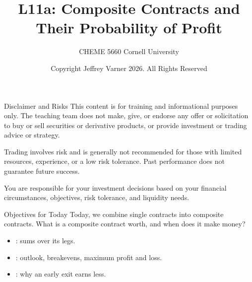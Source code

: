 \documentclass[aspectratio=169,11pt]{beamer}
\title{\texorpdfstring{{\vnheavy L11a}}{L11a}: Composite Contracts and Their Probability of Profit}
\subtitle{CHEME 5660 Cornell University}
\author{Copyright Jeffrey Varner 2026. All Rights Reserved}
\begin{document}
\vntitlepage

\begin{frame}{Disclaimer and Risks}
  \vspace{0.6em}
  \textbf{} This content is for training and informational
  purposes only. The teaching team does not make, give, or endorse any offer or
  solicitation to buy or sell securities or derivative products, or provide
  investment or trading advice or strategy.

  \vspace{1.1em}
  \textbf{} Trading involves risk and is generally not recommended for
  those with limited resources, experience, or a low risk tolerance. Past
  performance does not guarantee future success.

  \vspace{1.1em}
  \textbf{} You are responsible for your investment decisions
  based on your financial circumstances, objectives, risk tolerance, and
  liquidity needs.
\end{frame}

\begin{frame}{Objectives for Today}
  Today, we combine single contracts into composite contracts. What is a
  composite contract worth, and when does it make money?

  \vspace{0.5em}
  {\large\textbf{}}
  \begin{itemize}\setlength{\itemsep}{0.4em}
    \item {}: sums over its legs.
    \item {}: outlook, breakevens, maximum profit
      and loss.
    \item {}: why an early exit earns less.
  \end{itemize}
\end{frame}
\end{document}
